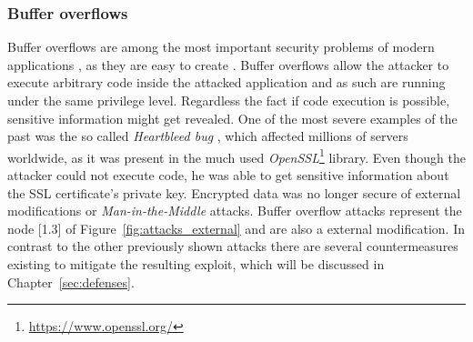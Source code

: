 \subsubsection{Buffer overflows}
Buffer overflows are among the most important security problems of modern applications \cite{pethia}, as they are easy to create \cite{bufferoverflows_easy}. Buffer overflows allow the attacker to execute arbitrary code inside the attacked application and as such are running under the same privilege level. Regardless the fact if code execution is possible, sensitive information might get revealed. One of the most severe examples of the past was the so called \emph{Heartbleed bug} \cite{durumeri}, which affected millions of servers worldwide, as it was present in the much used \emph{OpenSSL}\footnote{\url{https://www.openssl.org/}} library. Even though the attacker could not execute code, he was able to get sensitive information about the SSL certificate's private key. Encrypted data was no longer secure of external modifications or \emph{Man-in-the-Middle} attacks. Buffer overflow attacks represent the node [1.3] of Figure~\ref{fig:attacks_external} and are also a external modification. In contrast to the other previously shown attacks there are several countermeasures existing to mitigate the resulting exploit, which will be discussed in Chapter~\ref{sec:defenses}.